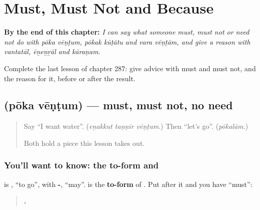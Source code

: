 
\chapter{Must, Must Not and Because}
\label{ch:ta-must-must-not-and-because}

\begin{chapteropening}
\textbf{By the end of this chapter:} \emph{I can say what someone must, must not or need not do with pōka vēṇṭum, pōkak kūṭātu and vara vēṇṭām, and give a reason with vantatāl, ēṉeṉṟāl and kāraṇam.}

Complete the last lesson of chapter 287: give advice with must and must not, and the reason for it, before or after the result.
\end{chapteropening}

\section[\texorpdfstring{\ta{போக} \ta{வேண்டும்} (pōka vēṇṭum)}{போக வேண்டும் (pōka vēṇṭum)}]{  (pōka vēṇṭum) — must, must not, no need}

\label{lesson:TA-C287-poka-ventum}



\begin{quote}
Say \textquotedblleft{}I want water\textquotedblright{}. (\emph{eṉakkut taṇṇīr vēṇṭum}.) Then \textquotedblleft{}let's go\textquotedblright{}. (\emph{pōkalām}.)

Both hold a piece this lesson takes out.
\end{quote}

\subsection*{You'll want to know: the to-form and }
\textbf{} is \textbf{}, \textquotedblleft{}to go\textquotedblright{}, with \textbf{-}, \textquotedblleft{}may\textquotedblright{}. \textbf{} is the \textbf{to-form} of \textbf{}. Put \textbf{} after it and you have \textquotedblleft{}must\textquotedblright{}:

\begin{quote}
\textbf{    .}
\end{quote}

